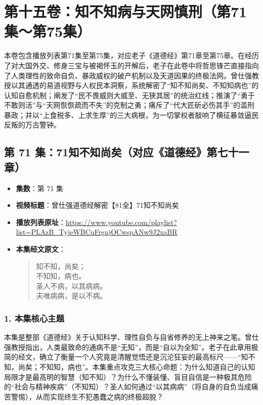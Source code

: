 \section*{第十五卷：知不知病与天网慎刑（第71集～第75集）}

本卷包含播放列表第71集至第75集，对应老子《道德经》第71章至第75章。在经历了对大国外交、修身三宝与被褐怀玉的开解后，老子在此卷中将哲思锋芒直接指向了人类理性的致命自负、暴政威权的破产机制以及天道因果的终极法网。曾仕强教授以其通透的易道视野与人权民本洞察，系统解密了“知不知尚矣、不知知病也”的认知自愈机制；阐发了“民不畏威则大威至、无狭其居”的统治红线；推演了“勇于不敢则活”与“天网恢恢疏而不失”的克制之勇；痛斥了“代大匠斫必伤其手”的滥刑暴政；并以“上食税多、上求生厚”的三大病根，为一切掌权者敲响了横征暴敛逼民反叛的万古警钟。

\clearpage

\subsection{第 71 集：71知不知尚矣（对应《道德经》第七十一章）}
\label{sec:ep71}

\begin{itemize}
    \item \textbf{集数}：第 71 集
    \item \textbf{视频标题}：曾仕强道德经解密【81全】71知不知尚矣
    \item \textbf{播放列表原址}：\url{https://www.youtube.com/playlist?list=PLAzB_TyjeWBCuFrgnjOCwspANw9J2xaBR}
    \item \textbf{本集经文原文}：
    \begin{quote}\kaishu
    知不知，尚矣；\\
    不知知，病也。\\
    圣人不病，以其病病。\\
    夫唯病病，是以不病。
    \end{quote}
\end{itemize}

\subsubsection{1. 本集核心主题}
本集是整部《道德经》关于认知科学、理性自负与自省修养的无上神来之笔。曾仕强教授指出，人类最致命的通病不是“无知”，而是“自以为全知”。老子在此章用极简的经文，确立了衡量一个人究竟是清醒觉悟还是沉沦狂妄的最高标尺——“知不知，尚矣；不知知，病也”。本集重点攻克三大核心命题：为什么知道自己的认知局限才是最高明的智慧（知不知）？为什么不懂装懂、盲目自信是一种极其危险的“社会与精神疾病”（不知知）？圣人如何通过“以其病病”（将自身的自负当成痛苦警惕），从而实现终生不犯愚蠢之病的终极超脱？

